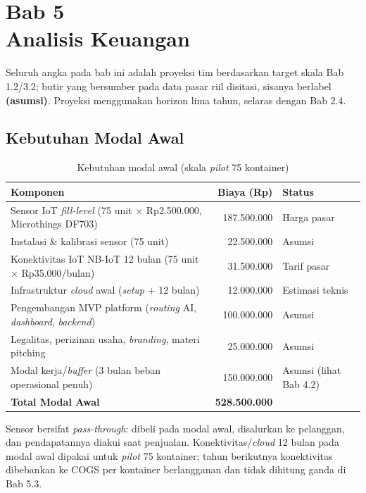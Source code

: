 \section{Bab 5\\Analisis Keuangan}

Seluruh angka pada bab ini adalah proyeksi tim berdasarkan target skala Bab 1.2/3.2; butir yang bersumber pada data pasar riil disitasi, sisanya berlabel \textbf{(asumsi)}. Proyeksi menggunakan horizon lima tahun, selaras dengan Bab 2.4.

\subsection{Kebutuhan Modal Awal}
\label{sec:5-1}

\begin{table}[H]
\footnotesize
\renewcommand{\arraystretch}{0.85}
\begin{tabularx}{\textwidth}{|X|r|>{\RaggedRight\arraybackslash}X|}
\hline
\textbf{Komponen} & \textbf{Biaya (Rp)} & \textbf{Status} \\
\hline
Sensor IoT \textit{fill-level} (75 unit $\times$ Rp2.500.000, Microthings DF703) & 187.500.000 & Harga pasar \parencite{microthings2026} \\
\hline
Instalasi \& kalibrasi sensor (75 unit) & 22.500.000 & Asumsi \\
\hline
Konektivitas IoT NB-IoT 12 bulan (75 unit $\times$ Rp35.000/bulan) & 31.500.000 & Tarif pasar \parencite{telkomseliot2026} \\
\hline
Infrastruktur \textit{cloud} awal (\textit{setup} + 12 bulan) & 12.000.000 & Estimasi teknis \parencite{awsiotcore2026} \\
\hline
Pengembangan MVP platform (\textit{routing} AI, \textit{dashboard}, \textit{backend}) & 100.000.000 & Asumsi \\
\hline
Legalitas, perizinan usaha, \textit{branding}, materi pitching & 25.000.000 & Asumsi \\
\hline
Modal kerja/\textit{buffer} (3 bulan beban operasional penuh) & 150.000.000 & Asumsi (lihat Bab 4.2) \\
\hline
\textbf{Total Modal Awal} & \textbf{528.500.000} & \\
\hline
\end{tabularx}
\caption{Kebutuhan modal awal (skala \textit{pilot} 75 kontainer)}
\end{table}

Sensor bersifat \textit{pass-through}: dibeli pada modal awal, disalurkan ke pelanggan, dan pendapatannya diakui saat penjualan. Konektivitas/\textit{cloud} 12 bulan pada modal awal dipakai untuk \textit{pilot} 75 kontainer; tahun berikutnya konektivitas dibebankan ke COGS per kontainer berlangganan dan tidak dihitung ganda di Bab 5.3.

